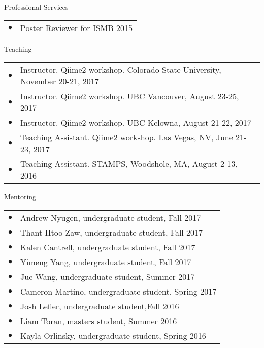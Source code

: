 \documentclass{resume} %
\begin{document}
\begin{rSection}{Professional Services}
  \begin{tabular}{ll}
    $\bullet$ & Poster Reviewer for ISMB 2015
  \end{tabular}
\end{rSection}

\begin{rSection}{Teaching}
  \begin{tabular}{ll}
    $\bullet$ & Instructor. Qiime2 workshop. Colorado State University, November 20-21, 2017 \\
    $\bullet$ & Instructor. Qiime2 workshop. UBC Vancouver, August 23-25, 2017 \\
    $\bullet$ & Instructor. Qiime2 workshop. UBC Kelowna, August 21-22, 2017 \\
    $\bullet$ & Teaching Assistant. Qiime2 workshop. Las Vegas, NV, June 21-23, 2017 \\
    $\bullet$ & Teaching Assistant. STAMPS, Woodshole, MA, August 2-13, 2016 \\
  \end{tabular}
\end{rSection}\newpage
\begin{rSection}{Mentoring}
  \begin{tabular}{ll}
    $\bullet$  &   Andrew Nyugen, undergraduate student, Fall 2017 \\
    $\bullet$  &   Thant Htoo Zaw, undergraduate student, Fall 2017 \\
    $\bullet$  &   Kalen Cantrell, undergraduate student, Fall 2017 \\
    $\bullet$  &   Yimeng Yang, undergraduate student, Fall 2017 \\
    $\bullet$  &   Jue Wang, undergraduate student, Summer 2017 \\
    $\bullet$  &   Cameron Martino, undergraduate student, Spring 2017 \\
    $\bullet$  &   Josh Lefler, undergraduate student,Fall 2016 \\
    $\bullet$  &   Liam Toran, masters student, Summer 2016 \\
    $\bullet$  &   Kayla Orlinsky, undergraduate student, Spring 2016 \\
  \end{tabular}
\end{rSection}
\end{document}
